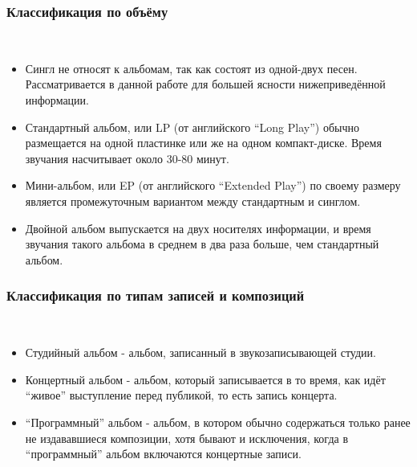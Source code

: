 \subsubsection{Классификация по объёму}
\label{sub:domain:music_album:volume_classification}
~\\
\begin{itemize}
  \item Сингл не относят к альбомам, так как состоят из одной-двух песен. Рассматривается в данной работе для большей ясности нижеприведённой информации.
  \item Стандартный альбом, или LP (от английского “Long Play”) обычно размещается на одной пластинке или же на одном компакт-диске. Время звучания насчитывает около 30-80 минут.
  \item Мини-альбом, или EP (от английского “Extended Play”) по своему размеру является промежуточным вариантом между стандартным и синглом.
  \item Двойной альбом выпускается на двух носителях информации, и время звучания такого альбома в среднем в два раза больше, чем стандартный альбом.
\end{itemize}

\subsubsection{Классификация по типам записей и композиций}
\label{sub:domain:music_album:records_type_classification}
~\\
\begin{itemize}
  \item Студийный альбом - альбом, записанный в звукозаписывающей студии.
  \item Концертный альбом - альбом, который записывается в то время, как идёт “живое” выступление перед публикой, то есть запись концерта.
  \item “Программный” альбом - альбом, в котором обычно содержаться только ранее не издававшиеся композиции, хотя бывают и исключения, когда в “программный” альбом включаются концертные записи.
\end{itemize}

